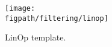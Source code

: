 \begin{figure}[t]
\centering
\texttt{[image: \\figpath/filtering/linop]}
%
\caption{LinOp template.}
\label{f:filters_linop}
\end{figure}